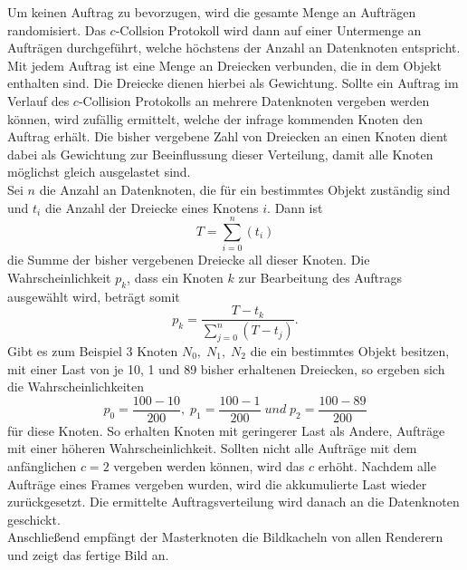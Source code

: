Um keinen Auftrag zu bevorzugen, wird die gesamte Menge an Aufträgen randomisiert. Das $c$-Collsion Protokoll wird dann auf einer Untermenge an Aufträgen durchgeführt, welche höchstens der Anzahl an Datenknoten entspricht. Mit jedem Auftrag ist eine Menge an Dreiecken verbunden, die in dem Objekt enthalten sind. Die Dreiecke dienen hierbei als Gewichtung. Sollte ein Auftrag im Verlauf des $c$-Collision Protokolls an mehrere Datenknoten vergeben werden können, wird zufällig ermittelt, welche der infrage kommenden Knoten den Auftrag erhält. Die bisher vergebene Zahl von Dreiecken an einen Knoten dient dabei als Gewichtung zur Beeinflussung dieser Verteilung, damit alle Knoten möglichst gleich ausgelastet sind.\\
Sei $n$ die Anzahl an Datenknoten, die für ein bestimmtes Objekt zuständig sind und $t_i$ die Anzahl der Dreiecke eines Knotens $i$. Dann ist
\[T=\sum_{i=0}^{n} \left(t_i\right)\]
die Summe der bisher vergebenen Dreiecke all dieser Knoten. Die Wahrscheinlichkeit $p_k$, dass ein Knoten $k$ zur Bearbeitung des Auftrags ausgewählt wird, beträgt somit 
  \[p_k=\frac{T-t_k}{\sum_{j=0}^{n} \left(T-t_j\right)}.\]
Gibt es zum Beispiel 3 Knoten $N_0,\; N_1,\; N_2$ die ein bestimmtes Objekt besitzen, mit einer Last von je 10, 1 und 89 bisher erhaltenen Dreiecken, so ergeben sich die Wahrscheinlichkeiten
\[p_0=\frac{100-10}{200}, \;p_1=\frac{100-1}{200}\; und \;p_2=\frac{100-89}{200}\]
für diese Knoten. So erhalten Knoten mit geringerer Last als Andere, Aufträge mit einer höheren Wahrscheinlichkeit. Sollten nicht alle Aufträge mit dem anfänglichen $c=2$ vergeben werden können, wird das $c$ erhöht. Nachdem alle Aufträge eines Frames vergeben wurden, wird die akkumulierte Last wieder zurückgesetzt. Die ermittelte Auftragsverteilung wird danach an die Datenknoten geschickt.\\
Anschließend empfängt der Masterknoten die Bildkacheln von allen Renderern und zeigt das fertige Bild an.

